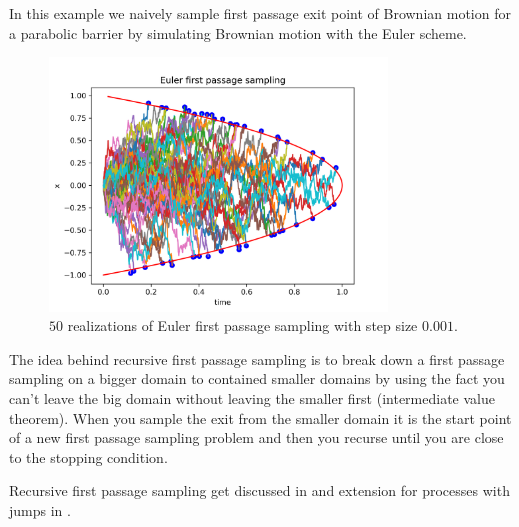 \documentclass[a4paper,12pt]{article}
\begin{document}
\begin{example}
    In this example we naively sample first passage exit point of Brownian motion
    for a parabolic barrier by simulating Brownian motion with the Euler scheme.
    \begin{figure}[ht!]
        \centering
        \includegraphics[width=0.8\textwidth]{plots/Euler first passage para.png}
        \caption{ $50$ realizations of Euler first passage sampling with step size $0.001$.}
        \label{fig:Euler first passage para}
    \end{figure}
\end{example}


\begin{technique}
    The idea behind recursive first passage sampling is to break down a first passage
    sampling on a bigger domain to contained smaller domains by using the fact you
    can't leave the big domain without leaving the smaller first
    (intermediate value theorem). When you sample the exit from the smaller domain
    it is the start point of a new first passage sampling problem and then you  recurse
    until you are close to the stopping condition.
\end{technique}

\begin{related}
    Recursive first passage sampling get discussed in \cite{herrmann_first-passage_2016}
    and extension for processes with jumps in \cite{herrmann_exact_2021}.
\end{related}
\end{document}
